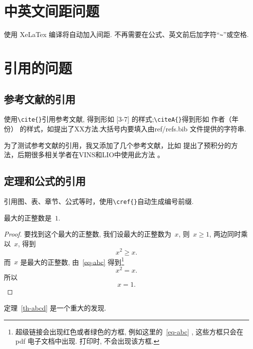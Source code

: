 \section{中英文间距问题}

使用 XeLaTex 编译将自动加入间距. 不再需要在公式、英文前后加字符``\verb|~|''或空格.

\section{引用的问题}


\subsection{参考文献的引用}
 使用\verb|\cite{}|引用参考文献, 得到形如 [3-7] 的样式\cite{AutowareFoundationOpen};\verb|\citeA{}|得到形如 作者（年份） 的样式，如提出了XX方法.大括号内要填入由ref/refs.bib 文件提供的字符串.

 为了测试参考文献的引用，我又添加了几个参考文献，比如 提出了预积分的方法，后期很多相关学者在VINS和LIO中使用此方法\cite{g.kumarLiDARIMUIntegrated2017} \cite{qinVINSMonoRobustVersatile2018} \cite{jiangImprovedIMUPreintegration2020}。

\subsection{定理和公式的引用}
引用图、表、章节、公式等时，使用\verb|\cref{}|自动生成编号前缀.

\begin{theorem}[谁发现的]\label{th-abcd}
最大的正整数是~$1$.
\end{theorem}

\begin{proof}
要找到这个最大的正整数, 我们设最大的正整数为~$x$, 则~$x \geqslant 1$, 两边同时乘以~$x$, 得到
\begin{equation}\label{eq-abc}
x^2 \geqslant x.
\end{equation}
而~$x$ 是最大的正整数, 由~\cref{eq-abc} 得到\footnote{超级链接会出现红色或者绿色的方框, 例如这里的~\cref{eq-abc} , 这些方框只会在 pdf 电子文档中出现. 打印时, 不会出现该方框.}
\[
x^2 = x.
\]
所以
\begin{equation*}
x = 1.
\end{equation*}
\end{proof}

定理~\cref{th-abcd} 是一个重大的发现.

